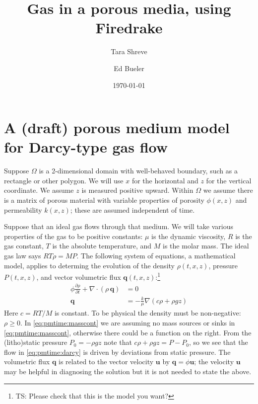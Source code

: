 \documentclass[11pt]{amsart}
\title{Gas in a porous media, using Firedrake}
\author{Tara Shreve}
\author{Ed Bueler}
\date{\today}
\newcommand{\bq}{\mathbf{q}}
\newcommand{\bu}{\mathbf{u}}
\newcommand{\Div}{\nabla\cdot}
\newcommand{\grad}{\nabla}
\begin{document}
\maketitle

\thispagestyle{empty}

\section{A (draft) porous medium model for Darcy-type gas flow}

Suppose $\Omega$ is a 2-dimensional domain with well-behaved boundary, such as a rectangle or other polygon.  We will use $x$ for the horizontal and $z$ for the vertical coordinate.  We assume $z$ is measured positive upward.  Within $\Omega$ we assume there is a matrix of porous material with variable properties of porosity $\phi(x,z)$ and permeability $k(x,z)$; these are assumed independent of time.

Suppose that an ideal gas flows through that medium.  We will take various properties of the gas to be positive constants: $\mu$ is the dynamic viscosity, $R$ is the gas constant, $T$ is the absolute temperature, and $M$ is the molar mass.  The ideal gas law says $RT \rho = M P$.  The following system of equations, a mathematical model, applies to determing the evolution of the density $\rho(t,x,z)$, pressure $P(t,x,z)$, and vector volumetric flux $\bq(t,x,z)$:\footnote{TS: Please check that this is the model you want?}
\begin{subequations}
\label{eq:pmtime}
\begin{align}
\phi \frac{\partial \rho}{\partial t} + \Div \left(\rho\, \bq\right) &= 0 \label{eq:pmtime:masscont} \\
\bq &= - \frac{k}{\mu} \grad\left(c \rho + \rho g z\right) \label{eq:pmtime:darcy}
\end{align}
\end{subequations}
Here $c = RT/M$ is constant.  To be physical the density must be non-negative: $\rho\ge 0$.  In \eqref{eq:pmtime:masscont} we are assuming no mass sources or sinks in \eqref{eq:pmtime:masscont}, otherwise there could be a function on the right.  From the (litho)static pressure $P_0=-\rho g z$ note that $c\rho+\rho g z = P-P_0$, so we see that the flow in \eqref{eq:pmtime:darcy} is driven by deviations from static pressure.  The volumetric flux $\bq$ is related to the vector velocity $\bu$ by $\bq = \phi \bu$; the velocity $\bu$ may be helpful in diagnosing the solution but it is not needed to state the above.
\end{document}
